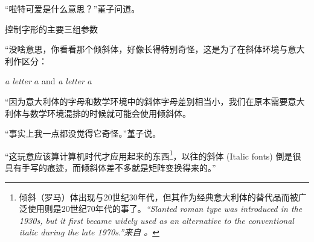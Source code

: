 “啦特可爱是什么意思？”堇子问道。

\begin{table}[h]
    \centering
    \caption{控制字形的主要三组参数}
    \label{tab:字形们}
\end{table}


“没啥意思，你看看那个倾斜体，好像长得特别奇怪，这是为了在斜体环境与意大利作区分：

\begin{center}
    \textsl{a letter $a$} and \textit{a letter $a$}
\end{center}

“因为意大利体的字母和数学环境中的斜体字母差别相当小，我们在原本需要意大利体与数学环境混排的时候就可能会使用倾斜体。

“事实上我一点都没觉得它奇怪。”堇子说。

“这玩意应该算计算机时代才应用起来的东西\footnote{倾斜（罗马）体出现与20世纪30年代，但其作为经典意大利体的替代品而被广泛使用则是20世纪70年代的事了。\slshape ``Slanted roman type was introduced in the 1930s, but it first became widely used as an alternative to the conventional italic during the late 1970s.''\upshape 来自  \textcite[The \TeX book]{knuth1984texbook}。}，以往的斜体 (Italic fonts) 倒是很具有手写的痕迹，而倾斜体差不多就是矩阵变换得来的。”

